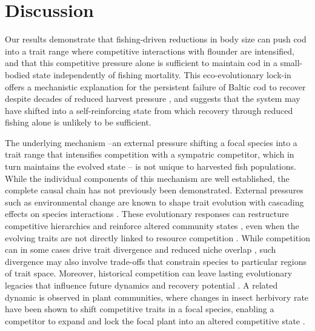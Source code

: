 \documentclass[12pt]{article}
\begin{document}

\section*{Discussion}

Our results demonstrate that fishing-driven reductions in body size can push cod into a trait range where competitive interactions with flounder are intensified, and that this competitive pressure alone is sufficient to maintain cod in a small-bodied state independently of fishing mortality. This eco-evolutionary lock-in offers a mechanistic explanation for the persistent failure of Baltic cod to recover despite decades of reduced harvest pressure \citep{Koster2017, Mion2021, ICES2022}, and suggests that the system may have shifted into a self-reinforcing state from which recovery through reduced fishing alone is unlikely to be sufficient.

The underlying mechanism --an external pressure shifting a focal species into a trait range that intensifies competition with a sympatric competitor, which in turn maintains the evolved state -- is not unique to harvested fish populations. While the individual components of this mechanism are well established, the complete causal chain has not previously been demonstrated. External pressures such as environmental change are known to shape trait evolution with cascading effects on species interactions \citep{ehrlich2025role}. These evolutionary responses can restructure competitive hierarchies and reinforce altered community states \citep{hart2019effects}, even when the evolving traits are not directly linked to resource competition \citep{mougi2007evolution}. While competition can in some cases drive trait divergence and reduced niche overlap \citep{clarke2017trait}, such divergence may also involve trade-offs that constrain species to particular regions of trait space. Moreover, historical competition can leave lasting evolutionary legacies that influence future dynamics and recovery potential \citep{govaert2021competition}. A related dynamic is observed in plant communities, where changes in insect herbivory rate have been shown to shift competitive traits in a focal species, enabling a competitor to expand and lock the focal plant into an altered competitive state \citep{agrawal2012insect}.
\end{document}
